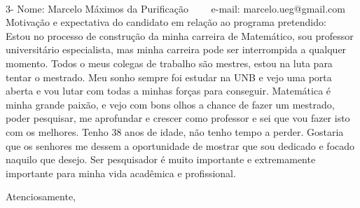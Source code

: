 \documentclass[11pt]{article}
\begin{document}
\\
3- Nome: Marcelo Máximos da Purificação
\ \ \ \ e-mail: marcelo.ueg@gmail.com
\\[0.2cm]
Motivação e expectativa do candidato em relação ao programa pretendido:
\\Estou no processo de construção da minha carreira de Matemático, sou professor universitário especialista, mas minha carreira pode ser interrompida a qualquer momento. Todos o meus colegas de trabalho são mestres, estou na luta para tentar o mestrado. Meu sonho sempre foi estudar na UNB e vejo uma porta aberta e vou lutar com todas a minhas forças para conseguir.
Matemática é minha grande paixão, e vejo com bons olhos a chance de fazer um mestrado, poder pesquisar, me aprofundar e crescer como professor e sei que vou fazer isto com os melhores.
Tenho 38 anos de idade, não tenho tempo a perder. Gostaria que os senhores me dessem a oportunidade de mostrar que sou dedicado e focado naquilo que desejo.
Ser pesquisador é muito importante e extremamente importante para minha vida acadêmica e profissional.

Atenciosamente,
\end{document}

